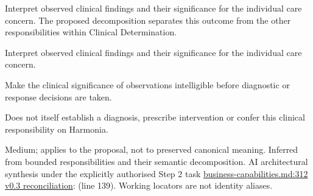 Interpret observed clinical findings and their significance for the individual care concern. The proposed decomposition separates this outcome from the other responsibilities within Clinical Determination.



Interpret observed clinical findings and their significance for the individual care concern.



Make the clinical significance of observations intelligible before diagnostic or response decisions are taken.



Does not itself establish a diagnosis, prescribe intervention or confer this clinical responsibility on Harmonia.


Medium; applies to the proposal, not to preserved canonical meaning.
Inferred from bounded responsibilities and their semantic decomposition. AI architectural synthesis under the explicitly authorised Step 2 task \hyperref[evidence:a4c0900c47c945d9]{business-capabilities.md:312}
\hyperref[model:reconciliation]{v0.3 reconciliation}: \texttt{} (line 139). Working locators are not identity aliases.
